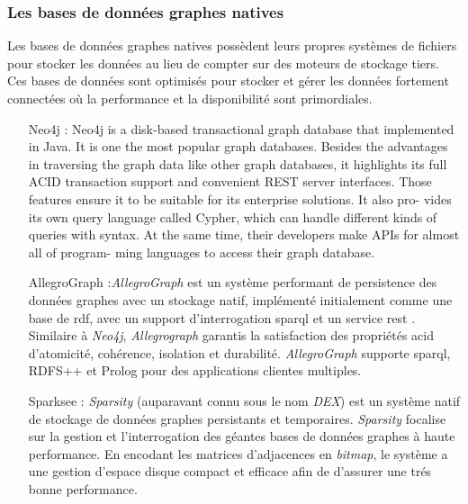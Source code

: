     \subsubsection{Les bases de données graphes natives}
    \label{sec:graphdb-native}
    Les bases de données graphes natives possèdent leurs propres
    systèmes de fichiers pour stocker les données au lieu de compter
    sur des moteurs de stockage tiers. Ces bases de données sont
    optimisés pour stocker et gérer les données fortement connectées
    où la performance et la disponibilité sont primordiales.

    \begin{itemize}
    \item [Neo4j]: Neo4j \cite{neo4j} is a disk-based transactional
      graph database that implemented in Java. It is one the most
      popular graph databases. Besides the advantages in traversing
      the graph data like other graph databases, it highlights its
      full ACID transaction support and convenient REST server
      interfaces. Those features ensure it to be suitable for its
      enterprise solutions. It also pro- vides its own query language
      called Cypher, which can handle different kinds of queries with
      syntax. At the same time, their developers make APIs for almost
      all of program- ming languages to access their graph database.

    \item [AllegroGraph]:\emph{AllegroGraph} \cite{allegrograph} est
      un système performant de persistence des données graphes avec un
      stockage natif, implémenté initialement comme une base de
      \acrshort{rdf}, avec un support d'interrogation
      \acrshort{sparql} et un service \acrshort{rest}
      \cite{fielding2000architectural}. Similaire à \emph{Neo4j},
      \emph{Allegrograph} garantis la satisfaction des propriétés
      \acrshort{acid} d'atomicité, cohérence, isolation et
      durabilité. \emph{AllegroGraph} supporte \acrshort{sparql},
      RDFS++ et Prolog pour des applications clientes multiples.

    \item [Sparksee]: \emph{Sparsity} \cite{sparksee} (auparavant
      connu sous le nom \emph{DEX}) est un système natif de stockage
      de données graphes persistants et temporaires. \emph{Sparsity}
      focalise sur la gestion et l'interrogation des géantes bases de
      données graphes à haute performance. En encodant les matrices
      d'adjacences en \emph{bitmap}, le système a une gestion d'espace
      disque compact et efficace afin de d'assurer une trés bonne
      performance.


\end{itemize}
